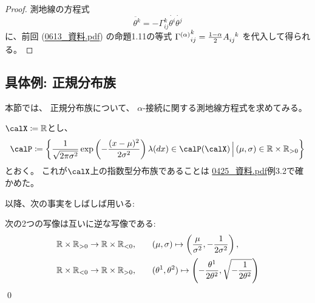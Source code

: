\documentclass[report]{jlreq}
\begin{document}
\begin{proof}
    測地線の方程式
    \begin{equation}
        \ddot{\theta^k}
            = - \Gamma_{ij}^k \dot{\theta^i} \dot{\theta^j}
    \end{equation}
    に、前回 (\url{0613_資料.pdf}) の命題1.11の等式
    ${\Gamma^{(\alpha)}}_{ij}^k = \frac{1 - \alpha}{2} A_{ij}^{\hphantom{ij}k}$
    を代入して得られる。
\end{proof}



%
\subsection{具体例: 正規分布族}

本節では、
正規分布族について、
$\alpha$-接続に関する測地線方程式を求めてみる。

\begin{settings}[正規分布族]
    $\calX \coloneqq \R$とし、
    \begin{equation}
        \calP \coloneqq \mybrace{
            \frac{1}{\sqrt{2 \pi \sigma^2}}
            \exp\myparen{
                - \frac{(x - \mu)^2}{2 \sigma^2}
            }
            \lambda(dx)
            \in \calP(\calX)
            \, \Big| \,
            (\mu, \sigma) \in \R \times \R_{> 0}
        }
    \end{equation}
    とおく。
    これが$\calX$上の指数型分布族であることは
    \url{0425_資料.pdf}例3.2で確かめた。
\end{settings}

以降、次の事実をしばしば用いる:

\begin{fact}
    次の2つの写像は互いに逆な{\smooth}写像である:
    \begin{alignat}{1}
        \mathbb{R} \times \mathbb{R}_{> 0} \to \mathbb{R} \times \mathbb{R}_{< 0},
            \qquad
            &(\mu, \sigma)
            \mapsto
            \left({
                \frac{\mu}{\sigma^2},
                - \frac{1}{2\sigma^2}
            }\right),
            \\
        \mathbb{R} \times \mathbb{R}_{< 0} \to \mathbb{R} \times \mathbb{R}_{> 0},
            \qquad
            &(\theta^1, \theta^2)
            \mapsto
            \left({
                - \frac{\theta^1}{2\theta^2},
                \sqrt{- \frac{1}{2\theta^2}}
            }\right)
    \end{alignat}
    \qed
\end{fact}
\end{document}

